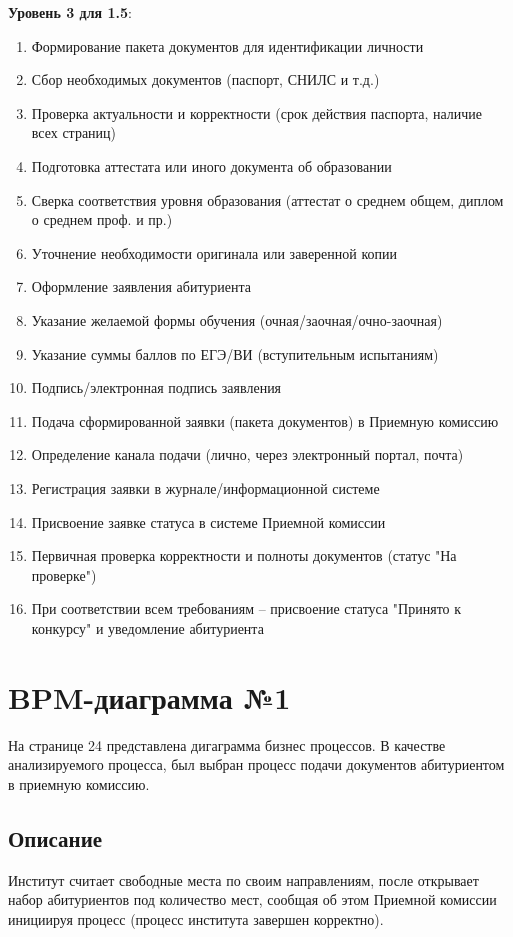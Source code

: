 \documentclass[areasetadvanced]{scrartcl}
\begin{document}
\textbf{Уровень 3 для 1.5}:
\begin{enumerate}
    \item Формирование пакета документов для идентификации личности
    \item Сбор необходимых документов (паспорт, СНИЛС и т.д.)
    \item Проверка актуальности и корректности (срок действия паспорта, наличие всех страниц)
    \item Подготовка аттестата или иного документа об образовании
    \item Сверка соответствия уровня образования (аттестат о среднем общем, диплом о среднем проф. и пр.)
    \item Уточнение необходимости оригинала или заверенной копии
    \item Оформление заявления абитуриента
    \item Указание желаемой формы обучения (очная/заочная/очно-заочная)
    \item Указание суммы баллов по ЕГЭ/ВИ (вступительным испытаниям)
    \item Подпись/электронная подпись заявления
    \item Подача сформированной заявки (пакета документов) в Приемную комиссию
    \item Определение канала подачи (лично, через электронный портал, почта)
    \item Регистрация заявки в журнале/информационной системе
    \item Присвоение заявке статуса в системе Приемной комиссии
    \item Первичная проверка корректности и полноты документов (статус "На проверке")
    \item При соответствии всем требованиям – присвоение статуса "Принято к конкурсу" и уведомление абитуриента
\end{enumerate}
\newpage
\section{BPM-диаграмма №1}
На странице 24 представлена дигаграмма бизнес процессов. 
В качестве анализируемого процесса, был выбран процесс подачи документов абитуриентом в приемную комиссию.
\subsection{Описание}
Институт считает свободные места по своим направлениям, после открывает набор абитуриентов под количество мест, сообщая об этом Приемной комиссии инициируя процесс (процесс института завершен корректно). 
\end{document}

